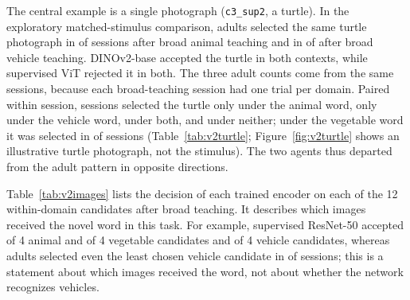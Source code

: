 \documentclass[11pt]{article}
\begin{document}
The central example is a single photograph (\texttt{c3\_sup2}, a turtle). In the exploratory matched-stimulus comparison, adults selected the same turtle photograph in \VtTurtleAnimalsK{} of \VtTurtleSessions{} sessions after broad animal teaching and in \VtTurtleVehiclesK{} of \VtTurtleSessions{} after broad vehicle teaching. DINOv2-base accepted the turtle in both contexts, while supervised ViT rejected it in both. The three adult counts come from the same \VtTurtleSessions{} sessions, because each broad-teaching session had one trial per domain. Paired within session, \VtTurtleOnlyAnimals{} sessions selected the turtle only under the animal word, \VtTurtleOnlyVehicles{} only under the vehicle word, \VtTurtleBoth{} under both, and \VtTurtleNeither{} under neither; under the vegetable word it was selected in \VtTurtleVegK{} of \VtTurtleSessions{} sessions (Table~\ref{tab:v2turtle}; Figure~\ref{fig:v2turtle} shows an illustrative turtle photograph, not the stimulus). The two agents thus departed from the adult pattern in opposite directions.

Table~\ref{tab:v2images} lists the decision of each trained encoder on each of the 12 within-domain candidates after broad teaching. It describes which images received the novel word in this task. For example, supervised ResNet-50 accepted \VtXEthreeAnimals{} of 4 animal and \VtXEthreeVeg{} of 4 vegetable candidates and \VtXEthreeVeh{} of 4 vehicle candidates, whereas adults selected even the least chosen vehicle candidate in \VtXRailcarK{} of \VtXPerCell{} sessions; this is a statement about which images received the word, not about whether the network recognizes vehicles.

\begin{table}[!htbp]
\centering\small

\caption{Exploratory: Extension by Teaching Condition, Adults and Agents on the Same Images}
\label{tab:v2matched}
\par{}
\end{table}
\end{document}

